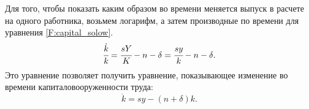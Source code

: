 Для того, чтобы показать каким образом во времени меняется выпуск в расчете на одного работника, возьмем логарифм, а затем производные по времени для уравнения \ref{F:capital_solow}.
\begin{equation*}
\cfrac{\dot{k}}{k} = \cfrac{sY}{K} - n - \delta = \cfrac{sy}{k} - n - \delta\text{.}
\end{equation*}
Это уравнение позволяет получить уравнение, показывающее изменение во времени капиталовооруженности труда:
\begin{equation*}
\dot{k}=sy-(n + \delta)k\text{.}
\end{equation*}
